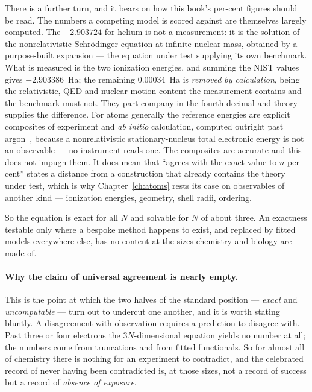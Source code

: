 There is a further turn, and it bears on how this book's per-cent figures should be read. The
numbers a competing model is scored against are themselves largely computed. The $-2.903724$ for
helium is not a measurement: it is the solution of the nonrelativistic Schr\"odinger equation at
infinite nuclear mass, obtained by a purpose-built expansion --- the equation under test supplying
its own benchmark. What is measured is the two ionization energies, and summing the NIST values
gives $-2.903386$~Ha; the remaining $0.00034$~Ha is \emph{removed by calculation}, being the
relativistic, QED and nuclear-motion content the measurement contains and the benchmark must not.
They part company in the fourth decimal and theory supplies the difference. For atoms generally the
reference energies are explicit composites of experiment and \emph{ab initio} calculation, computed
outright past argon~\cite{Chakravorty}, because a nonrelativistic stationary-nucleus total
electronic energy is not an observable --- no instrument reads one. The composites are accurate and
this does not impugn them. It does mean that ``agrees with the exact value to $n$ per cent'' states
a distance from a construction that already contains the theory under test, which is why
Chapter~\ref{ch:atoms} rests its case on observables of another kind --- ionization energies,
geometry, shell radii, ordering.

So the equation is exact for all $N$ and solvable for $N$ of about three. An exactness testable
only where a bespoke method happens to exist, and replaced by fitted models everywhere else, has no
content at the sizes chemistry and biology are made of.

\paragraph{Why the claim of universal agreement is nearly empty.}
This is the point at which the two halves of the standard position --- \emph{exact} and
\emph{uncomputable} --- turn out to undercut one another, and it is worth stating bluntly. A
disagreement with observation requires a prediction to disagree with. Past three or four electrons
the $3N$-dimensional equation yields no number at all; the numbers come from truncations and from fitted
functionals. So for almost all of chemistry there is nothing for an experiment to contradict, and
the celebrated record of never having been contradicted is, at those sizes, not a record of success
but a record of \emph{absence of exposure}.

